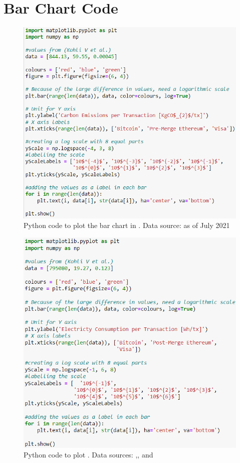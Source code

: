 \chapter{Bar Chart Code}

\begin{figure}[h]
    \centering
    \includegraphics[width=13cm,center]{Figures/CarbonEmissionsPlotCode.png}
    \caption*{Python code to plot the bar chart in . Data source: \cite{Kohli2023AnSolutions} as of July 2021}
    \label{Figure:CarbonEmissionsPlotCode}
\end{figure}


\begin{figure}[h]
    \centering
    \includegraphics[width=13cm,center]{Figures/ElectrictyConsumptionPlotCode.png}
    \caption*{Python code to plot . Data sources: \cite{VisaHome},\cite{2022VisaReport},\cite{BitcoinDigiconomist}  and  }
    \label{Figure:ElectrictyConsumptionPlotCode}
\end{figure}

